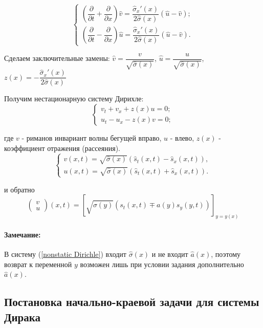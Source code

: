 \documentclass{article}
\newenvironment{observation}{ \paragraph{Замечание:}}{\\}
\begin{document}
\begin{equation*}
\begin{cases}
	(\dfrac{\partial}{\partial t} + \dfrac{\partial}{\partial x}) \hat{v} = \dfrac{\hat{\sigma}_x'(x)}{2 \hat{\sigma}(x)} (\hat{u} - \hat{v});\\
	(\dfrac{\partial}{\partial t} - \dfrac{\partial}{\partial x}) \hat{u} = \dfrac{\hat{\sigma}_x'(x)}{2 \hat{\sigma}(x)} (\hat{u} - \hat{v}).
\end{cases}
\end{equation*}

Сделаем заключительные замены:
$\hat{v} = \dfrac{v}{\sqrt{\hat{\sigma}(x)}}$,
$\hat{u} = \dfrac{u}{\sqrt{\hat{\sigma}(x)}}$, 
$z(x) = - \dfrac{\hat{\sigma}_x'(x)}{2 \hat{\sigma}(x)}$

Получим нестационарную систему Дирихле:
\begin{equation}
\begin{cases}
     v_t + v_x + z(x) u = 0;\\
     u_t - u_x - z(x) v = 0;
\end{cases}
\label{nonstatic Dirichle}
\end{equation}

где $v$ - риманов инвариант волны бегущей вправо,
$u$ - влево, $z(x)$ - коэффициент отражения (рассеяния).
\begin{equation*}
\begin{cases}
    v(x,t) = \sqrt{\hat{\sigma}(x)} (\hat{s}_t(x,t) - \hat{s}_x(x,t)),\\
    u(x,t) = \sqrt{\hat{\sigma}(x)} (\hat{s}_t(x,t) + \hat{s}_x(x,t)).
\end{cases}
\end{equation*}

и обратно
\begin{equation*}
	\begin{pmatrix}v\\u\end{pmatrix} (x,t) = 
	[\sqrt{\sigma(y)}(s_t(x,t) \mp a(y)s_y(y,t))]_{y=y(x)} 
\end{equation*}

\vspace{0.2cm}
\begin{observation}
 В систему (\ref{nonstatic Dirichle}) входит $\hat{\sigma}(x)$ и не входит $\hat{a}(x)$, поэтому возврат к переменной $y$ возможен лишь при условии задания дополнительно  $\hat{a}(x)$.
\end{observation}

\subsection*{Постановка начально-краевой задачи для системы Дирака}
\end{document}
